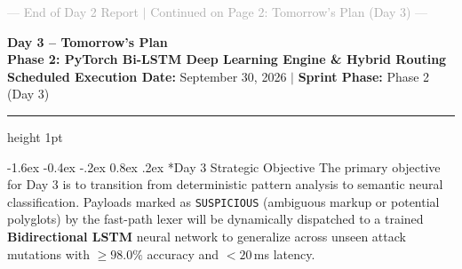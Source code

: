 \documentclass[11pt,a4paper]{article}
\makeatletter
\renewcommand{\section}{\@startsection{section}{1}{\z@}%
  {-1.6ex \@plus -0.4ex \@minus -.2ex}%
  {0.8ex \@plus .2ex}%
  {\normalfont\large\bfseries\color{primaryblue}}}
\makeatother
\begin{document}
\vfill
\begin{center}
\footnotesize \textcolor{darkgray}{--- End of Day 2 Report $\vert$ Continued on Page 2: Tomorrow's Plan (Day 3) ---}
\end{center}

\newpage

\begin{center}
    {\LARGE \textbf{\color{primaryblue} Day 3 -- Tomorrow's Plan}} \\[0.25em]
    {\large \textbf{Phase 2: PyTorch Bi-LSTM Deep Learning Engine \& Hybrid Routing}} \\[0.2em]
    {\footnotesize \textbf{Scheduled Execution Date:} September 30, 2026 \quad $\vert$ \quad \textbf{Sprint Phase:} Phase 2 (Day 3)}
\end{center}

\vspace{0.3em}
\hrule height 1pt
\vspace{0.8em}

\section*{Day 3 Strategic Objective}
The primary objective for Day 3 is to transition from deterministic pattern analysis to semantic neural classification. Payloads marked as \texttt{SUSPICIOUS} (ambiguous markup or potential polyglots) by the fast-path lexer will be dynamically dispatched to a trained \textbf{Bidirectional LSTM} neural network to generalize across unseen attack mutations with $\ge 98.0\%$ accuracy and $< 20$\,ms latency.
\end{document}
